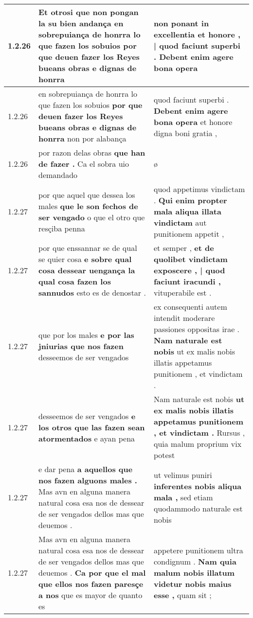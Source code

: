 \begin{tabular}{|p{1cm}|p{6.5cm}|p{6.5cm}|}
1.2.26 & Et otrosi que non pongan la su bien andança \textbf{ en sobrepuiança de honrra lo que fazen los sobuios } por que deuen fazer los Reyes bueans obras e dignas de honrra & non ponant \textbf{ in excellentia et honore , | quod faciunt superbi . } Debent enim agere bona opera \\\hline
1.2.26 & en sobrepuiança de honrra lo que fazen los sobuios \textbf{ por que deuen fazer los Reyes bueans obras e dignas de honrra } non por alabança & quod faciunt superbi . \textbf{ Debent enim agere bona opera } et honore digna boni gratia , \\\hline
1.2.26 & por razon delas obras \textbf{ que han de fazer . } Ca el sobra uio demandado & ø \\\hline
1.2.27 & por que aquel que dessea los males \textbf{ que le son fechos de ser vengado } o que el otro que resçiba penna & quod appetimus vindictam . \textbf{ Qui enim propter mala aliqua illata vindictam } aut punitionem appetit , \\\hline
1.2.27 & por que enssannar se de qual se quier cosa \textbf{ e sobre qual cosa dessear uengança la qual cosa fazen los sannudos } esto es de denostar . & et semper , \textbf{ et de quolibet vindictam exposcere , | quod faciunt iracundi , } vituperabile est . \\\hline
1.2.27 & que por los males \textbf{ e por las jniurias que nos fazen } desseemos de ser vengados & ex consequenti autem intendit moderare passiones oppositas irae . \textbf{ Nam naturale est nobis } ut ex malis nobis illatis appetamus punitionem , et vindictam . \\\hline
1.2.27 & desseemos de ser vengados \textbf{ e los otros que las fazen sean atormentados } e ayan pena & Nam naturale est nobis \textbf{ ut ex malis nobis illatis appetamus punitionem , et vindictam . } Rursus , quia malum proprium vix potest \\\hline
1.2.27 & e dar pena \textbf{ a aquellos que nos fazen alguons males . } Mas avn en alguna manera natural cosa esa nos de dessear de ser vengados dellos mas que deuemos . & ut velimus puniri \textbf{ inferentes nobis aliqua mala , } sed etiam quodammodo naturale est nobis \\\hline
1.2.27 & Mas avn en alguna manera natural cosa esa nos de dessear de ser vengados dellos mas que deuemos . \textbf{ Ca por que el mal que ellos nos fazen paresçe a nos } que es mayor de quanto es & appetere punitionem ultra condignum . \textbf{ Nam quia malum nobis illatum videtur nobis maius esse , } quam sit ; \\\hline

\end{tabular}
